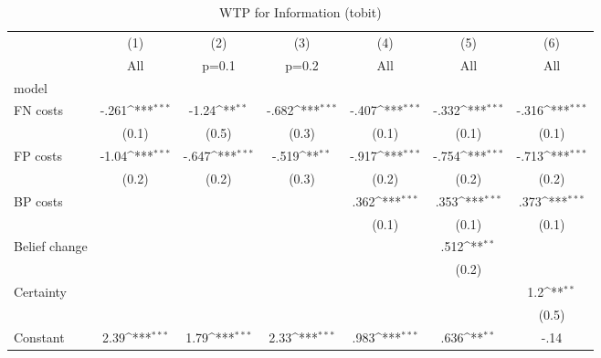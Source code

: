 \begin{table}[htbp]\centering
\def\sym#1{\ifmmode^{#1}\else\(^{#1}\)\fi}
\caption{WTP for Information (tobit)}\label{tab:tobitMain}
\begin{tabular}{l*{6}{c}}
\hline\hline
                &\multicolumn{1}{c}{(1)}&\multicolumn{1}{c}{(2)}&\multicolumn{1}{c}{(3)}&\multicolumn{1}{c}{(4)}&\multicolumn{1}{c}{(5)}&\multicolumn{1}{c}{(6)}\\
                &\multicolumn{1}{c}{All}&\multicolumn{1}{c}{p=0.1}&\multicolumn{1}{c}{p=0.2}&\multicolumn{1}{c}{All}&\multicolumn{1}{c}{All}&\multicolumn{1}{c}{All}\\
\hline
model           &                  &                  &                  &                  &                  &                  \\
FN costs        &    -.261\sym{***}&    -1.24\sym{**} &    -.682\sym{***}&    -.407\sym{***}&    -.332\sym{***}&    -.316\sym{***}\\
                &    (0.1)         &    (0.5)         &    (0.3)         &    (0.1)         &    (0.1)         &    (0.1)         \\
FP costs        &    -1.04\sym{***}&    -.647\sym{***}&    -.519\sym{**} &    -.917\sym{***}&    -.754\sym{***}&    -.713\sym{***}\\
                &    (0.2)         &    (0.2)         &    (0.3)         &    (0.2)         &    (0.2)         &    (0.2)         \\
BP costs        &                  &                  &                  &     .362\sym{***}&     .353\sym{***}&     .373\sym{***}\\
                &                  &                  &                  &    (0.1)         &    (0.1)         &    (0.1)         \\
Belief change   &                  &                  &                  &                  &     .512\sym{**} &                  \\
                &                  &                  &                  &                  &    (0.2)         &                  \\
Certainty       &                  &                  &                  &                  &                  &      1.2\sym{**} \\
                &                  &                  &                  &                  &                  &    (0.5)         \\
Constant        &     2.39\sym{***}&     1.79\sym{***}&     2.33\sym{***}&     .983\sym{***}&     .636\sym{**} &     -.14         \\

\end{tabular}
\end{table}
